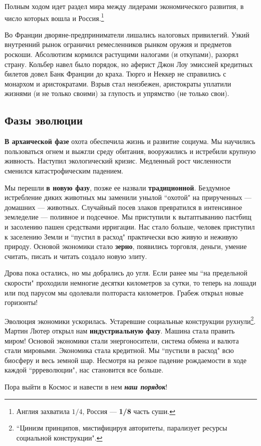 Полным ходом идет раздел мира между лидерами экономического развития, в число которых вошла и
Россия.\footnote{Англия захватила $1/4$, Россия — \textbf{1/8} часть суши.}

Во Франции дворяне-предприниматели лишались налоговых привилегий. Узкий внутренний рынок ограничил ремесленников
рынком оружия и предметов роскоши. Абсолютизм кормился растущими налогами (и откупами), разорял страну. Кольбер навел
было порядок, но аферист Джон Лоу эмиссией кредитных билетов довел Банк Франции до краха. Тюрго и Неккер не справились
с монархом и аристократами. Взрыв стал неизбежен, аристократы уплатили жизнями (и не только своими) за глупость и
упрямство (не только свои).

\subsection{Фазы эволюции}

\textbf{В архаической фазе }охота обеспечила жизнь и развитие социума. Мы научились пользоваться огнем и выжгли среду
обитания, вооружились и истребили крупную живность. Наступил экологический кризис. Медленный рост численности сменился
катастрофическим падением.


Мы перешли \textbf{в новую фазу}, позже ее назвали \textbf{традиционной}. Бездумное истребление диких животных мы
заменили унылой ``охотой" на прирученных — домашних — животных. Случайный посев злаков
превратился в интенсивное земледелие — поливное и подсечное. Мы приступили к вытаптыванию пастбищ и засолению пашен
средствами ирригации. Нас стало больше, человек приступил к заселению Земли и ``пустил в
расход" практически всю живую и неживую природу. Основой экономики стало \textbf{зерно}, появились
торговля, деньги, умение считать, писать и читать создало новую элиту.


Дрова пока остались, но мы добрались до угля. Если ранее мы ``на предельной скорости" проходили немногие десятки километров за сутки, то теперь на лошади или под парусом мы одолевали полтораста километров.
Грабеж открыл новые горизонты!


Эволюция экономики ускорилась. Устаревшие социальные конструкции рухнули\footnote{``Цинизм
принципов, мистифицируя авторитеты, парализует ресурсы социальной конструкции".}. Мартин Лютер открыл
нам \textbf{индустриальную фазу}. Машина стала править миром! Основой экономики стали энергоносители, система обмена и
валюта стали мировыми. Экономика стала кредитной. Мы ``пустили в расход" всю биосферу и весь
земной шар. Несмотря на резкое падение рождаемости в ходе каждой ``ррреволюции", нас
становится все больше.


Пора выйти в Космос и навести в нем \textbf{\textit{наш порядок}}!
%
